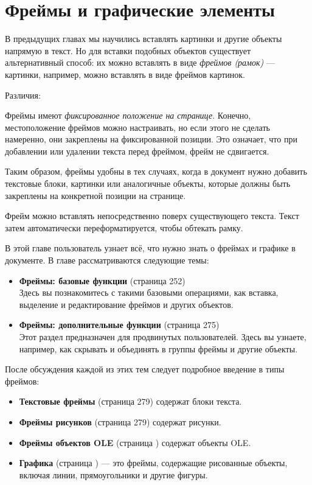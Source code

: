 ﻿\documentclass[a4paper,10pt]{article}
\begin{document}
\section{Фреймы и графические элементы} \label{sec:фреймыиграфэл}
В предыдущих главах мы научились вставлять картинки и другие объекты напрямую в текст. Но для вставки подобных объектов существует альтернативный способ: их можно вставлять в виде \textit{фреймов (рамок)} — картинки, например, можно вставлять в виде фреймов картинок.

Различия:

Фреймы имеют \textit{фиксированное положение на странице}. Конечно, местоположение фреймов можно настраивать, но если этого не сделать намеренно, они закреплены на фиксированной позиции. Это означает, что при добавлении или удалении текста перед фреймом, фрейм не сдвигается.

Таким образом, фреймы удобны в тех случаях, когда в документ нужно добавить текстовые блоки, картинки или аналогичные объекты, которые должны быть закреплены на конкретной позиции на странице.

Фрейм можно вставлять непосредственно поверх существующего текста. Текст затем автоматически переформатируется, чтобы обтекать рамку.

В этой главе пользователь узнает всё, что нужно знать о фреймах и графике в документе. В главе рассматриваются следующие темы:

\begin{itemize}
 \item \textbf{Фреймы: базовые функции} (страница 252)\\
 Здесь вы познакомитесь с такими базовыми операциями, как вставка, выделение и редактирование фреймов и других объектов.
 \item \textbf{Фреймы: дополнительные функции} (страница 275)\\
 Этот раздел предназначен для продвинутых пользователей. Здесь вы узнаете, например, как скрывать и объединять в группы фреймы и другие объекты.
 \end{itemize}
 
После обсуждения каждой из этих тем следует подробное введение в типы фреймов:

\begin{itemize}
 \item \textbf{Текстовые фреймы} (страница 279) содержат блоки текста.
 \item \textbf{Фреймы рисунков}  (страница 279) содержат рисунки.
 \item \textbf{Фреймы объектов OLE} (страница ) содержат объекты OLE.
 \item \textbf{Графика} (страница ) — это фреймы, содержащие рисованные объекты, включая линии, прямоугольники и другие фигуры.
\end{itemize}
\end{document}
